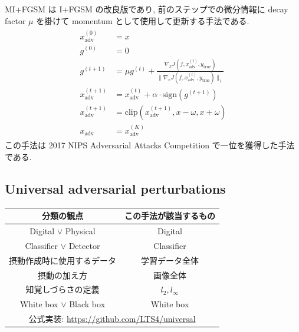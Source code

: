 MI+FGSM は I+FGSM の改良版であり, 前のステップでの微分情報に decay factor $\mu$ を掛けて momentum として使用して更新する手法である.
%
\begin{eqnarray}
\begin{aligned}
x_{\text{adv}}^{(0)} &= x \\
g^{(0)} &= 0 \\
g^{(t + 1)} &= \mu g^{(t)} + \frac{\nabla_x J (f, x_{\text{adv}}^{(t)}, y_{\text{true}})}{\|\nabla_x J (f, x_{\text{adv}}^{(t)}, y_{\text{true}})\|_1} \\
x_{\text{adv}}^{(t + 1)} &= x_{\text{adv}}^{(t)} + \alpha \cdot \text{sign} (g^{(t + 1)}) \\
x_{\text{adv}}^{(t + 1)} &= \text{clip} (x_{\text{adv}}^{(t + 1)}, x - \omega, x + \omega) \\
x_{\text{adv}} &= x_{\text{adv}}^{(K)}
\end{aligned}
\label{eq:mifgsm}
\end{eqnarray}
%
この手法は 2017 NIPS Adversarial Attacks Competition で一位を獲得した手法である.



\subsection{Universal adversarial perturbations}
\label{subsec:universal-adversarial}
%
\begin{table}[htbp]
\begin{center}
\begin{tabular}{|c|c|}
\hline
分類の観点 & この手法が該当するもの \\
\hline
Digital $\lor$ Physical & Digital \\
Classifier $\lor$ Detector & Classifier \\
摂動作成時に使用するデータ & 学習データ全体 \\
摂動の加え方 & 画像全体 \\
知覚しづらさの定義 & $l_2, l_{\infty}$ \\
White box $\lor$ Black box & White box \\
\hline
\multicolumn{2}{|c|}{公式実装: \href{https://github.com/LTS4/universal}{https://github.com/LTS4/universal}} \\
\hline
\end{tabular}
\label{tb:universal-adversarial-summary}
\end{center}
\end{table}
%

